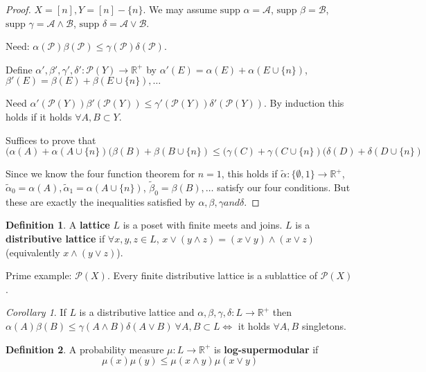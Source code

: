\documentclass[a4paper]{article}
\theoremstyle{definition}
\newtheorem*{definition}{Definition}
\theoremstyle{remark}
\theoremstyle{default}
\newtheorem{corollary}[theorem]{Corollary}
\begin{document}
\begin{proof}
	$X=[n], Y=[n]-\{n\}$.
	We may assume $\text{supp }\alpha = \mathcal{A}$, $\text{supp }\beta = \mathcal{B}$,
	$\text{supp }\gamma = \mathcal{A} \wedge \mathcal{B}$, $\text{supp }\delta = \mathcal{A} \vee \mathcal{B}$.
	
	Need: $\alpha(\mathcal{P})\beta(\mathcal{P}) \leq \gamma(\mathcal{P})\delta(\mathcal{P})$.
	
	Define $\alpha', \beta', \gamma', \delta': \mathcal{P}(Y) \to \mathbb{R}^+$ by
	$\alpha'(E) = \alpha(E)+\alpha(E \cup \{n\})$,
	$\beta'(E) = \beta(E)+\beta(E \cup \{n\}), \dots$
	
	Need $\alpha'(\mathcal{P}(Y))\beta'(\mathcal{P}(Y)) \leq \gamma'(\mathcal{P}(Y))\delta'(\mathcal{P}(Y))$.
	By induction this holds if it holds $\forall A, B \subset Y$.
	
	Suffices to prove that
	$$(\alpha(A) + \alpha(A \cup \{n\})(\beta(B) + \beta(B \cup \{n\}) \leq (\gamma(C) + \gamma(C \cup \{n\})(\delta(D) + \delta(D \cup \{n\})$$
	
	Since we know the four function theorem for $n=1$,
	this holds if $\tilde{\alpha}:\{\emptyset, 1\} \to \mathbb{R}^+$,
	$\tilde{\alpha}_0=\alpha(A), \tilde{\alpha}_1=\alpha(A\cup\{n\})$,
	$\tilde{\beta}_0=\beta(B), \dots$
	satisfy our four conditions.
	But these are exactly the inequalities satisfied by $\alpha, \beta, \gamma and \delta$.
\end{proof}

\begin{definition}
	A \textbf{lattice} $L$ is a poset with finite meets and joins.
	$L$ is a \textbf{distributive lattice} if $\forall x, y, z \in L$,
	$x \vee (y \wedge z) = (x \vee y ) \wedge (x \vee z)$
	(equivalently $x \wedge (y \vee z)$).
\end{definition}

Prime example: $\mathcal{P}(X)$.
Every finite distributive lattice is a sublattice of $\mathcal{P}(X)$.

\begin{corollary}
	If $L$ is a distributive lattice and $\alpha, \beta, \gamma, \delta: L \to \mathbb{R}^+$
	then $\alpha(A)\beta(B) \leq \gamma(A \wedge B) \delta(A \vee B)\ \forall A,B \subset L \iff$
	it holds $\forall A, B$ singletons.
\end{corollary}

\begin{definition}
	A probability measure $\mu: L \to \mathbb{R}^+$ is \textbf{log-supermodular} if
	$$\mu(x)\mu(y) \leq \mu(x \wedge y)\mu(x \vee y)$$
\end{definition}
\end{document}
